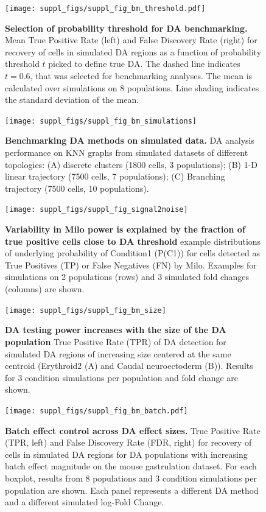 \documentclass[
]{article}
\begin{document}
\begin{figure}
\centering
\texttt{[image: suppl\_figs/suppl\_fig\_bm\_threshold.pdf]}
\caption{\label{fig:sup-fig-bm-threshold}\textbf{Selection of probability threshold for DA benchmarking.} Mean True Positive Rate (left) and False Discovery Rate (right) for recovery of cells in simulated DA regions as a function of probability threshold \(t\) picked to define true DA. The dashed line indicates \(t = 0.6\), that was selected for benchmarking analyses. The mean is calculated over simulations on 8 populations. Line shading indicates the standard deviation of the mean.}
\end{figure}



\begin{figure}
\texttt{[image: suppl\_figs/suppl\_fig\_bm\_simulations]} \caption{\textbf{Benchmarking DA methods on simulated data.} DA analysis performance on KNN graphs from simulated datasets of different topologies: (A) discrete clusters (1800 cells, 3 populations); (B) 1-D linear trajectory (7500 cells, 7 populations); (C) Branching trajectory (7500 cells, 10 populations).}\label{fig:sup-fig-bm-simulations}
\end{figure}



\begin{figure}
\texttt{[image: suppl\_figs/suppl\_fig\_signal2noise]} \caption{\textbf{Variability in Milo power is explained by the fraction of true positive cells close to DA threshold} example distributions of underlying probability of Condition1 (P(C1)) for cells detected as True Positives (TP) or False Negatives (FN) by Milo. Examples for simulations on 2 populations (rows) and 3 simulated fold changes (columns) are shown.}\label{fig:sup-fig-bm-signal}
\end{figure}



\begin{figure}
\texttt{[image: suppl\_figs/suppl\_fig\_bm\_size]} \caption{\textbf{DA testing power increases with the size of the DA population} True Positive Rate (TPR) of DA detection for simulated DA regions of increasing size centered at the same centroid (Erythroid2 (A) and Caudal neuroectoderm (B)). Results for 3 condition simulations per population and fold change are shown.}\label{fig:sup-fig-bm-size}
\end{figure}



\begin{figure}
\centering
\texttt{[image: suppl\_figs/suppl\_fig\_bm\_batch.pdf]}
\caption{\label{fig:sup-fig-bm-batch}\textbf{Batch effect control across DA effect sizes.} True Positive Rate (TPR, left) and False Discovery Rate (FDR, right) for recovery of cells in simulated DA regions for DA populations with increasing batch effect magnitude on the mouse gastrulation dataset. For each boxplot, results from 8 populations and 3 condition simulations per population are shown. Each panel represents a different DA method and a different simulated log-Fold Change.}
\end{figure}
\end{document}
